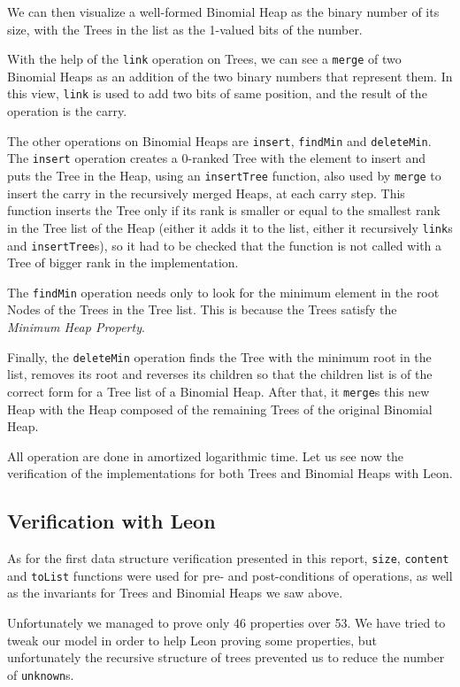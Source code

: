 We can then visualize a well-formed Binomial Heap as the binary number of its size, 
with the Trees in the list as the 1-valued bits of the number.

With the help of the \verb|link| operation on Trees, 
we can see a \verb|merge| of two Binomial Heaps 
as an addition of the two binary numbers that represent them.
In this view, \verb|link| is used to add two bits of same position,
and the result of the operation is the carry.

The other operations on Binomial Heaps are \verb|insert|, \verb|findMin| and \verb|deleteMin|. 
The \verb|insert| operation creates a 0-ranked Tree with the element to insert 
and puts the Tree in the Heap, using an \verb|insertTree| function, 
also used by \verb|merge| to insert the carry in the recursively merged Heaps,
at each carry step.
This function inserts the Tree only if its rank is smaller or equal to the smallest rank in the Tree list of the Heap 
(either it adds it to the list, either it recursively \verb|link|s and \verb|insertTree|s),
so it had to be checked that the function is not called with a Tree of bigger rank in the implementation.

The \verb|findMin| operation needs only to look for the minimum element 
in the root Nodes of the Trees in the Tree list.
This is because the Trees satisfy the \emph{Minimum Heap Property}.

Finally, the \verb|deleteMin| operation finds the Tree with the minimum root in the list,
removes its root 
and reverses its children so that the children list is of the correct form for a Tree list of a Binomial Heap.
After that, it \verb|merge|s this new Heap with the Heap composed of 
the remaining Trees of the original Binomial Heap.

All operation are done in amortized logarithmic time.
Let us see now the verification of the implementations 
for both Trees and Binomial Heaps with Leon.

\subsection{Verification with Leon}
As for the first data structure verification presented in this report,
 \verb|size|, \verb|content| and \verb|toList| functions were used
 for pre- and post-conditions of operations,
as well as the invariants for Trees and Binomial Heaps we saw above.

Unfortunately we managed to prove only 46 properties over 53. 
We have tried to tweak our model in order to help Leon proving some properties,
but unfortunately the recursive structure of trees prevented us to reduce the number of \verb|unknown|s.

